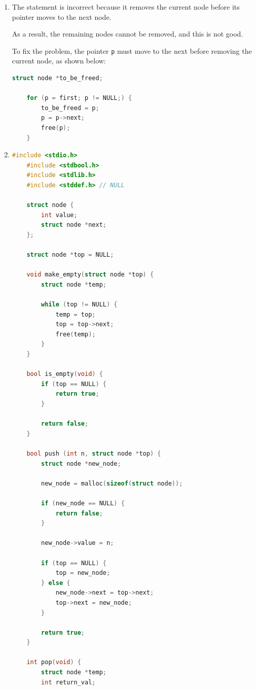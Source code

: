 \documentclass[12pt]{article}
\begin{document}
\begin{enumerate}[1.]
    \item

    The statement is incorrect because it removes the current node before its
    pointer moves to the next node.

    \bigskip

    As a result, the remaining nodes cannot be removed, and this is not good.

    \bigskip

    To fix the problem, the pointer \texttt{p} must move to the next before removing
    the current node, as shown below:


\begin{lstlisting}[language=c]
    struct node *to_be_freed;

    for (p = first; p != NULL;) {
        to_be_freed = p;
        p = p->next;
        free(p);
    }
\end{lstlisting}

    \item

\begin{lstlisting}[language=c]
    #include <stdio.h>
    #include <stdbool.h>
    #include <stdlib.h>
    #include <stddef.h> // NULL

    struct node {
        int value;
        struct node *next;
    };

    struct node *top = NULL;

    void make_empty(struct node *top) {
        struct node *temp;

        while (top != NULL) {
            temp = top;
            top = top->next;
            free(temp);
        }
    }

    bool is_empty(void) {
        if (top == NULL) {
            return true;
        }

        return false;
    }

    bool push (int n, struct node *top) {
        struct node *new_node;

        new_node = malloc(sizeof(struct node));

        if (new_node == NULL) {
            return false;
        }

        new_node->value = n;

        if (top == NULL) {
            top = new_node;
        } else {
            new_node->next = top->next;
            top->next = new_node;
        }

        return true;
    }

    int pop(void) {
        struct node *temp;
        int return_val;


\end{lstlisting}
\end{enumerate}
\end{document}
